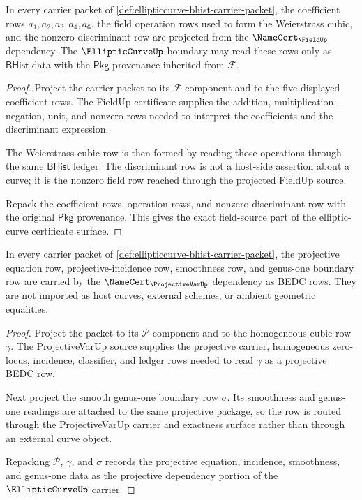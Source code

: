 \begin{theorem}
\label{thm:ellipticcurve-field-source-obligation}
In every carrier packet of \autoref{def:ellipticcurve-bhist-carrier-packet}, the coefficient rows $a_1,a_2,a_3,a_4,a_6$, the field operation rows used to form the Weierstrass cubic, and the nonzero-discriminant row are projected from the $\NameCert_{\FieldUp}$ dependency. The $\EllipticCurveUp$ boundary may read these rows only as $\mathsf{BHist}$ data with the $\mathsf{Pkg}$ provenance inherited from $\mathcal{F}$.
\end{theorem}
\begin{proof}
Project the carrier packet to its $\mathcal{F}$ component and to the five displayed coefficient rows. The FieldUp certificate supplies the addition, multiplication, negation, unit, and nonzero rows needed to interpret the coefficients and the discriminant expression.

The Weierstrass cubic row is then formed by reading those operations through the same $\mathsf{BHist}$ ledger. The discriminant row is not a host-side assertion about a curve; it is the nonzero field row reached through the projected FieldUp source.

Repack the coefficient rows, operation rows, and nonzero-discriminant row with the original $\mathsf{Pkg}$ provenance. This gives the exact field-source part of the elliptic-curve certificate surface.
\end{proof}

\begin{theorem}
\label{thm:ellipticcurve-projective-genus-one-obligation}
In every carrier packet of \autoref{def:ellipticcurve-bhist-carrier-packet}, the projective equation row, projective-incidence row, smoothness row, and genus-one boundary row are carried by the $\NameCert_{\ProjectiveVarUp}$ dependency as BEDC rows. They are not imported as host curves, external schemes, or ambient geometric equalities.
\end{theorem}
\begin{proof}
Project the packet to its $\mathcal{P}$ component and to the homogeneous cubic row $\gamma$. The ProjectiveVarUp source supplies the projective carrier, homogeneous zero-locus, incidence, classifier, and ledger rows needed to read $\gamma$ as a projective BEDC row.

Next project the smooth genus-one boundary row $\sigma$. Its smoothness and genus-one readings are attached to the same projective package, so the row is routed through the ProjectiveVarUp carrier and exactness surface rather than through an external curve object.

Repacking $\mathcal{P}$, $\gamma$, and $\sigma$ records the projective equation, incidence, smoothness, and genus-one data as the projective dependency portion of the $\EllipticCurveUp$ carrier.
\end{proof}

